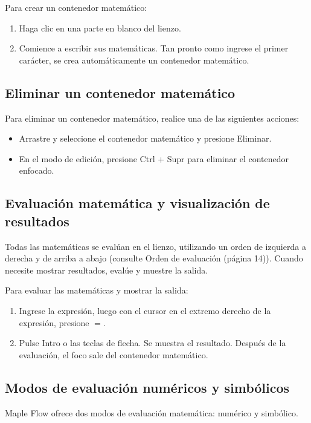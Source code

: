 Para crear un contenedor matemático:

\begin{enumerate}
	\item Haga clic en una parte en blanco del lienzo.
	
	\item Comience a escribir sus matemáticas. Tan pronto como ingrese el primer carácter, se crea automáticamente un contenedor matemático.
\end{enumerate}

\subsection{Eliminar un contenedor matemático}
Para eliminar un contenedor matemático, realice una de las siguientes acciones:

\begin{itemize}
  \item Arrastre y seleccione el contenedor matemático y presione Eliminar.

\item En el modo de edición, presione Ctrl + Supr para eliminar el contenedor enfocado.
\end{itemize}

\subsection{Evaluación matemática y visualización de resultados}
Todas las matemáticas se evalúan en el lienzo, utilizando un orden de izquierda a derecha y de arriba a abajo (consulte Orden de evaluación (página 14)). Cuando necesite mostrar resultados, evalúe y muestre la salida.

Para evaluar las matemáticas y mostrar la salida:
\begin{enumerate}
  \item Ingrese la expresión, luego con el cursor en el extremo derecho de la expresión, presione $=$.

\item Pulse Intro o las teclas de flecha. Se muestra el resultado. Después de la evaluación, el foco sale del contenedor matemático.
\end{enumerate}

\subsection{Modos de evaluación numéricos y simbólicos}
Maple Flow ofrece dos modos de evaluación matemática: numérico y simbólico.


